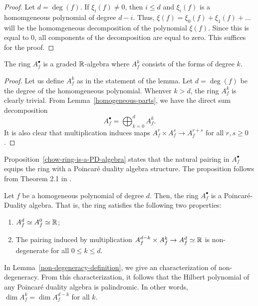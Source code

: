 \documentclass{puthesis-UG}
\begin{document}
\begin{proof}
	Let $d = \deg (f)$. If $\xi_i (f) \neq 0$, then $i \leq d$ and $\xi_i(f)$ is a homomgeneous polynomial of degree $d-i$. Thus, $\xi (f) = \xi_0 (f) + \xi_1(f) + \ldots$ will be the homomgeneous decomposition of the polynomial $\xi(f)$. Since this is equal to $0$, all components of the decomposition are equal to zero. This suffices for the proof. 
\end{proof}

\begin{prop}
	The ring $A_f^\bullet$ is a graded $\mathbb{R}$-algebra where $A_f^k$ consists of the forms of degree $k$. 
\end{prop}

\begin{proof}
	Let us define $A_f^k$ as in the statement of the lemma. Let $d = \deg (f)$ be the degree of the homomgeneous polynomial. Whenver $k > d$, the ring $A_f^k$ is clearly trivial. From Lemma~\ref{homogeneous-parts}, we have the direct sum decomposition 
	\[
		A_f^\bullet = \bigoplus_{k = 0}^d A_f^k.
	\]
	It is also clear that multiplication induces maps $A_f^r \times A_f^s \to A_f^{r+s}$ for all $r, s \geq 0$.
\end{proof}

Proposition~\ref{chow-ring-is-a-PD-algebra} states that the natural pairing in $A_f^\bullet$ equips the ring with a Poincar\'e duality algebra structure. The proposition follows from Theorem 2.1 in \cite{maeno2009lefschetz}. 
\begin{prop} \label{chow-ring-is-a-PD-algebra}
	Let $f$ be a homogeneous polynomial of degree $d$. Then, the ring $A_f^\bullet$ is a Poincar\'e-Duality algebra. That is, the ring satisfies the following two properties:
	\begin{enumerate}[label = (\alph*)]
		\item $A_f^d \simeq A_f^0 \simeq \mathbb{R}$;

		\item The pairing induced by multiplication $A_f^{d-k} \times A_f^k \to A_f^d \simeq \mathbb{R}$ is non-degenerate for all $0 \leq k \leq d$. 
	\end{enumerate}
\end{prop}

In Lemma~\ref{non-degeneracy-definition}, we give an characterization of non-degeneracy. From this characterization, it follows that the Hilbert polynomial of any Poincar\'e duality algebra is palindromic. In other words, $\dim A_f^k = \dim A_f^{d-k}$ for all $k$. 
\end{document}
